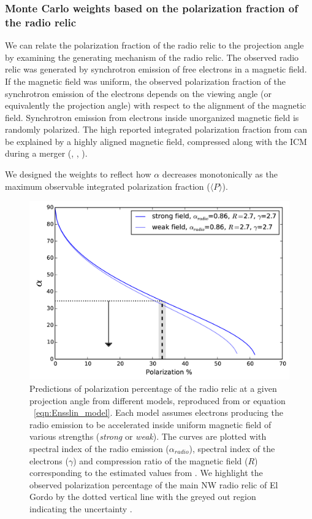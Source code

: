 \documentclass[letterpaper,useAMS,usenatbib]{mn2e}
\begin{document}
\subsubsection{Monte Carlo weights based on the polarization fraction of the radio relic}
%

We can relate the polarization fraction of the radio relic to the
projection angle by examining the
generating mechanism of the radio relic.
The observed radio relic was generated by synchrotron emission of free electrons in a
magnetic field. If the magnetic field was uniform, the observed
polarization fraction of the synchrotron emission of the electrons depends on the
viewing angle (or equivalently the projection angle) with respect to the
alignment of the magnetic field. Synchrotron emission from electrons inside
unorganized magnetic field is
randomly polarized. The high reported integrated polarization fraction from
\citet{L13} can be explained by a highly aligned magnetic field,
compressed along with the ICM during a merger
(\citealt{E98}, \citealt{vanWeeren10}, \citealt{Feretti12}).
\par
We designed the weights to reflect how $\alpha$ decreases monotonically as the
maximum observable integrated polarization fraction ($\langle P \rangle$). 
\begin{figure}
	\includegraphics[width=\linewidth]{Ensslin_polar_fig.png}
	\caption{Predictions of polarization percentage of the radio relic at a
		given projection angle from different models, reproduced from
		\citep{E98} or equation ~\ref{eqn:Ensslin_model}. Each model assumes electrons producing the radio emission
		to be accelerated inside uniform magnetic field of various strengths ({\it strong} or 
		{\it weak}). The curves are plotted with spectral index of the radio emission
		($\alpha_{radio}$), spectral index of the electrons ($\gamma$) and
		compression ratio of the magnetic field ($R$) corresponding to the
		estimated values from \citet{L13}.
		We highlight the observed polarization percentage of the main NW radio relic
		of El Gordo by the dotted vertical line with the greyed out region
		indicating the uncertainty \citep{L13}.\label{fig:Ensslin_fig}}
\end{figure}
\end{document}
